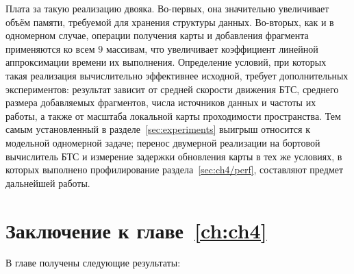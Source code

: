 Плата за такую реализацию двояка. Во-первых, она значительно увеличивает объём памяти, требуемой для хранения структуры данных. Во-вторых, как и в одномерном случае, операции получения карты и добавления фрагмента применяются ко всем $9$ массивам, что увеличивает коэффициент линейной аппроксимации времени их выполнения. Определение условий, при которых такая реализация вычислительно эффективнее исходной, требует дополнительных экспериментов: результат зависит от средней скорости движения БТС, среднего размера добавляемых фрагментов, числа источников данных и частоты их работы, а также от масштаба локальной карты проходимости пространства. Тем самым установленный в разделе~\ref{sec:experiments} выигрыш относится к модельной одномерной задаче; перенос двумерной реализации на бортовой вычислитель БТС и измерение задержки обновления карты в тех же условиях, в которых выполнено профилирование раздела~\cref{sec:ch4/perf}, составляют предмет дальнейшей работы.

\section{Заключение к главе~\ref{ch:ch4}}

В главе получены следующие результаты:

